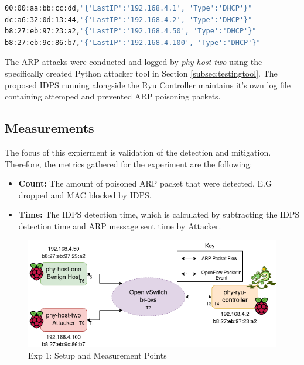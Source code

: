 \documentclass[12pt, oneside]{book}
\begin{document}
\begin{lstlisting}[language=Bash,caption={Known MAC list pairing file},captionpos=b,label={lst:macknownfile}]
00:00:aa:bb:cc:dd,"{'LastIP':'192.168.4.1', 'Type':'DHCP'}"
dc:a6:32:0d:13:44,"{'LastIP':'192.168.4.2', 'Type':'DHCP'}"
b8:27:eb:97:23:a2,"{'LastIP':'192.168.4.50', 'Type':'DHCP'}"
b8:27:eb:9c:86:b7,"{'LastIP':'192.168.4.100', 'Type':'DHCP'}"
\end{lstlisting}

The ARP attacks were conducted and logged by \emph{phy-host-two} using the specifically created Python attacker
tool in Section \ref{subsec:testingtool}.
The proposed IDPS running alongside the Ryu Controller maintains it's own log file containing attemped
and prevented ARP poisoning packets.

\subsection{Measurements} 
The focus of this expierment is validation of the detection and mitigation.
Therefore, the metrics gathered for the experiment are the following:
\begin{itemize}
  \itemsep0em 
  \item \textbf{Count:} The amount of poisoned ARP packet that were detected, E.G dropped and MAC blocked by IDPS.
  \item \textbf{Time:} The IDPS detection time, which is calculated by subtracting the IDPS detection time and ARP message sent time by Attacker.
\end{itemize}

\begin{figure}[H]
  \centering
  \includegraphics[scale=0.6]{images/exp1set.png}
  \caption{Exp 1: Setup and Measurement Points}
  \label{fig:exp1points}
\end{figure}
\end{document}
